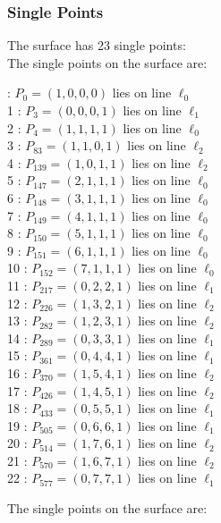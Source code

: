 \documentclass{article}
\begin{document}
{\subsubsection*{Single Points}
The surface has 23 single points:\\
The single points on the surface are:\\
\begin{multicols}{2}
 : $P_{0}=( 1, 0, 0, 0 )$ lies on line $\ell_{0}$\\
1 : $P_{3}=( 0, 0, 0, 1 )$ lies on line $\ell_{1}$\\
2 : $P_{4}=( 1, 1, 1, 1 )$ lies on line $\ell_{0}$\\
3 : $P_{83}=( 1, 1, 0, 1 )$ lies on line $\ell_{2}$\\
4 : $P_{139}=( 1, 0, 1, 1 )$ lies on line $\ell_{2}$\\
5 : $P_{147}=( 2, 1, 1, 1 )$ lies on line $\ell_{0}$\\
6 : $P_{148}=( 3, 1, 1, 1 )$ lies on line $\ell_{0}$\\
7 : $P_{149}=( 4, 1, 1, 1 )$ lies on line $\ell_{0}$\\
8 : $P_{150}=( 5, 1, 1, 1 )$ lies on line $\ell_{0}$\\
9 : $P_{151}=( 6, 1, 1, 1 )$ lies on line $\ell_{0}$\\
10 : $P_{152}=( 7, 1, 1, 1 )$ lies on line $\ell_{0}$\\
11 : $P_{217}=( 0, 2, 2, 1 )$ lies on line $\ell_{1}$\\
12 : $P_{226}=( 1, 3, 2, 1 )$ lies on line $\ell_{2}$\\
13 : $P_{282}=( 1, 2, 3, 1 )$ lies on line $\ell_{2}$\\
14 : $P_{289}=( 0, 3, 3, 1 )$ lies on line $\ell_{1}$\\
15 : $P_{361}=( 0, 4, 4, 1 )$ lies on line $\ell_{1}$\\
16 : $P_{370}=( 1, 5, 4, 1 )$ lies on line $\ell_{2}$\\
17 : $P_{426}=( 1, 4, 5, 1 )$ lies on line $\ell_{2}$\\
18 : $P_{433}=( 0, 5, 5, 1 )$ lies on line $\ell_{1}$\\
19 : $P_{505}=( 0, 6, 6, 1 )$ lies on line $\ell_{1}$\\
20 : $P_{514}=( 1, 7, 6, 1 )$ lies on line $\ell_{2}$\\
21 : $P_{570}=( 1, 6, 7, 1 )$ lies on line $\ell_{2}$\\
22 : $P_{577}=( 0, 7, 7, 1 )$ lies on line $\ell_{1}$\\
\end{multicols}
The single points on the surface are:\\
}
\end{document}
